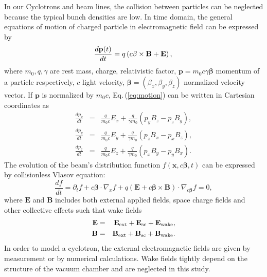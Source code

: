 \documentclass[aps,prstab,twocolumn,superscriptaddress]{revtex4}
\newcommand{\bs}[1]{\mathbf #1}
\begin{document}
In our Cyclotrons and beam lines, the collision between particles can be neglected because the   typical bunch densities are low.
In time domain, the general equations of motion of charged particle in electromagnetic field can be expressed by
\begin{equation}\label{eq:motion}
  \frac{d\bs{p}(t)}{dt}  = q\left(c\bs{\beta}\times \bs{B} + \bs{E}\right), \nonumber \\
\end{equation}
where $m_0, q,\gamma$ are rest mass, charge, relativistic factor, $\bs{p}=m_0 c \gamma \bs{\beta}$ momentum of a particle respectively, 
$c$ light velocity, $\bs{\beta}=(\beta_x, \beta_y, \beta_z)$ normalized velocity vector. If $\bs{p}$ is normalized by $m_0c$, 
Eq.\,(\ref{eq:motion}) can be written in Cartesian coordinates as 
\begin{eqnarray}\label{eq:motion2}
  \frac{dp_x}{dt} & = & \frac{q}{m_0c}E_x + \frac{q}{\gamma m_0}(p_y B_z - p_z B_y),    \nonumber \\
  \frac{dp_y}{dt} & = & \frac{q}{m_0c}E_y + \frac{q}{\gamma m_0}(p_z B_x - p_x B_z),   \\
  \frac{dp_z}{dt} & = & \frac{q}{m_0c}E_z + \frac{q}{\gamma m_0}(p_x B_y - p_y B_x).    \nonumber 
\end{eqnarray}
The evolution of the beam's distribution function $ f(\bs {x},c\bs{\beta},t)$ can be expressed by collisionless Vlasov equation:
\begin{equation}\label{eq:Vlasov}
  \frac{df}{dt}=\partial_t f + c\bs{\beta} \cdot \nabla_x f +q(\bs{E}+ c\bs{\beta}\times\bs{B})\cdot \nabla_{c\bs{\beta}} f  =  0, 
\end{equation}
where $\bs{E}$ and $\bs{B}$ includes both external applied fields, space charge fields and other collective effects such that wake fields
\begin{eqnarray}\label{eq:Allfield}
  \bs{E} & = & \bs{E_{\RM{ext}}}+\bs{E_{\RM{sc}}}+\bs{E_{\RM{wake}}}, \nonumber\\    
  \bs{B} & = & \bs{B_{\RM{ext}}}+\bs{B_{\RM{sc}}}+\bs{B_{\RM{wake}}}.
\end{eqnarray}
In order to model a cyclotron, the external electromagnetic fields are given by measurement or by numerical calculations. 
Wake fields tightly depend on the structure of the vacuum chamber and are neglected in this study. 
\end{document}
